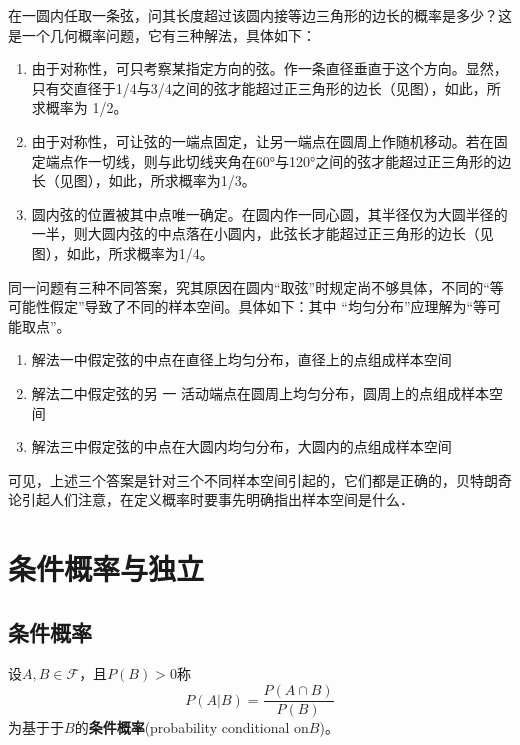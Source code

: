 在一圆内任取一条弦，问其长度超过该圆内接等边三角形的边长的概率是多少？这是一个几何概率问题，它有三种解法，具体如下：
\begin{enumerate}
    \item 由于对称性，可只考察某指定方向的弦。作一条直径垂直于这个方向。显然，只有交直径于1/4与3/4之间的弦才能超过正三角形的边长（见图），如此，所求概率为 1/2。
    \item 由于对称性，可让弦的一端点固定，让另一端点在圆周上作随机移动。若在固定端点作一切线，则与此切线夹角在60°与120°之间的弦才能超过正三角形的边长（见图），如此，所求概率为1/3。
    \item 圆内弦的位置被其中点唯一确定。在圆内作一同心圆，其半径仅为大圆半径的一半，则大圆内弦的中点落在小圆内，此弦长才能超过正三角形的边长（见图），如此，所求概率为1/4。
\end{enumerate}

同一问题有三种不同答案，究其原因在圆内“取弦”时规定尚不够具体，不同的“等可能性假定”导致了不同的样本空间。具体如下：其中
“均匀分布”应理解为“等可能取点”。
\begin{enumerate}
    \item 解法一中假定弦的中点在直径上均匀分布，直径上的点组成样本空间
    \item 解法二中假定弦的另 一 活动端点在圆周上均匀分布，圆周上的点组成样本空间
    \item 解法三中假定弦的中点在大圆内均匀分布，大圆内的点组成样本空间
\end{enumerate}

可见，上述三个答案是针对三个不同样本空间引起的，它们都是正确的，贝特朗奇论引起人们注意，在定义概率时要事先明确指出样本空间是什么．

\section{条件概率与独立}

\subsection{条件概率}

\begin{definition}[条件概率]
    设$A,B \in \mathscr{F}$，且$P(B)>0$称
    \[ P(A|B) = \frac{P(A \cap B)}{P(B)}\]
    为基于于$B$的\textbf{条件概率}(probability conditional on$B$)。
\end{definition}

